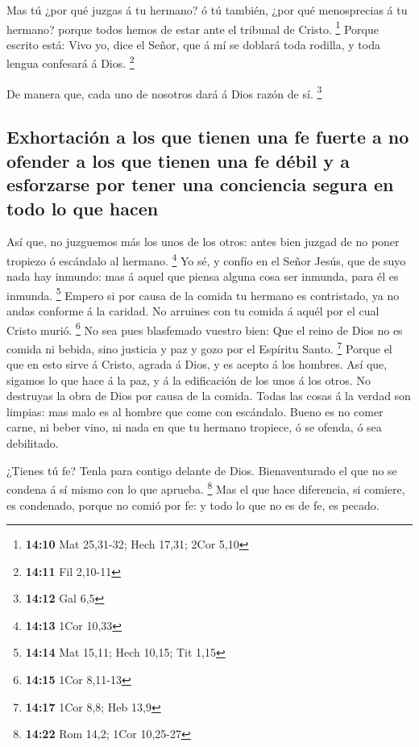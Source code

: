  Mas tú ¿por qué juzgas á tu hermano? ó tú también, ¿por
qué menosprecias á tu hermano? porque todos hemos de estar ante el
tribunal de Cristo. \footnote{\textbf{14:10} Mat 25,31-32; Hech 17,31;
  2Cor 5,10}  Porque escrito está: Vivo yo, dice el Señor,
que á mí se doblará toda rodilla, y toda lengua confesará á Dios.
\footnote{\textbf{14:11} Fil 2,10-11}

 De manera que, cada uno de nosotros dará á Dios razón de
sí. \footnote{\textbf{14:12} Gal 6,5}

\hypertarget{exhortaciuxf3n-a-los-que-tienen-una-fe-fuerte-a-no-ofender-a-los-que-tienen-una-fe-duxe9bil-y-a-esforzarse-por-tener-una-conciencia-segura-en-todo-lo-que-hacen}{%
\subsection{Exhortación a los que tienen una fe fuerte a no ofender a
los que tienen una fe débil y a esforzarse por tener una conciencia
segura en todo lo que
hacen}\label{exhortaciuxf3n-a-los-que-tienen-una-fe-fuerte-a-no-ofender-a-los-que-tienen-una-fe-duxe9bil-y-a-esforzarse-por-tener-una-conciencia-segura-en-todo-lo-que-hacen}}

 Así que, no juzguemos más los unos de los otros: antes
bien juzgad de no poner tropiezo ó escándalo al hermano. \footnote{\textbf{14:13}
  1Cor 10,33}  Yo sé, y confío en el Señor Jesús, que de
suyo nada hay inmundo: mas á aquel que piensa alguna cosa ser inmunda,
para él es inmunda. \footnote{\textbf{14:14} Mat 15,11; Hech 10,15; Tit
  1,15}  Empero si por causa de la comida tu hermano es
contristado, ya no andas conforme á la caridad. No arruines con tu
comida á aquél por el cual Cristo murió. \footnote{\textbf{14:15} 1Cor
  8,11-13}  No sea pues blasfemado vuestro bien:
 Que el reino de Dios no es comida ni bebida, sino justicia
y paz y gozo por el Espíritu Santo. \footnote{\textbf{14:17} 1Cor 8,8;
  Heb 13,9}  Porque el que en esto sirve á Cristo, agrada á
Dios, y es acepto á los hombres.  Así que, sigamos lo que
hace á la paz, y á la edificación de los unos á los otros. 
No destruyas la obra de Dios por causa de la comida. Todas las cosas á
la verdad son limpias: mas malo es al hombre que come con escándalo.
 Bueno es no comer carne, ni beber vino, ni nada en que tu
hermano tropiece, ó se ofenda, ó sea debilitado.

 ¿Tienes tú fe? Tenla para contigo delante de Dios.
Bienaventurado el que no se condena á sí mismo con lo que aprueba.
\footnote{\textbf{14:22} Rom 14,2; 1Cor 10,25-27}  Mas el
que hace diferencia, si comiere, es condenado, porque no comió por fe: y
todo lo que no es de fe, es pecado.

